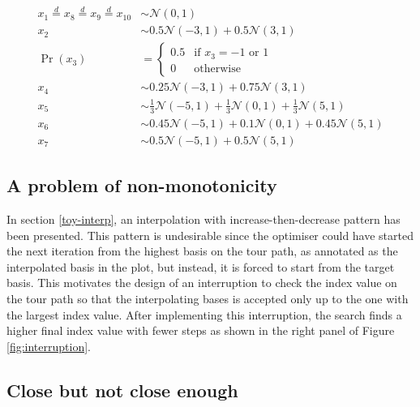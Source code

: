 \begin{align}
x_1 \overset{d}{=} x_8 \overset{d}{=} x_9 \overset{d}{=} x_{10}& \sim \mathcal{N}(0, 1) \label{eq:sim-norm} \\
x_2 &\sim 0.5 \mathcal{N}(-3, 1) + 0.5 \mathcal{N}(3, 1)\label{eq:sim-x2}\\
\Pr(x_3) &= 
\begin{cases}
0.5 & \text{if $x_3 = -1$ or $1$}\\
0 & \text{otherwise}
\end{cases}\label{eq:sim-x3}\\
x_4 &\sim 0.25 \mathcal{N}(-3, 1) + 0.75 \mathcal{N}(3, 1) \label{eq:sim-x4}\\
x_5 &\sim \frac{1}{3} \mathcal{N}(-5, 1) + \frac{1}{3} \mathcal{N}(0, 1) + \frac{1}{3} \mathcal{N}(5, 1)\label{eq:sim-x5}\\
x_6 &\sim 0.45 \mathcal{N}(-5, 1) + 0.1 \mathcal{N}(0, 1) + 0.45 \mathcal{N}(5, 1)\label{eq:sim-x6}\\
x_7 &\sim 0.5 \mathcal{N}(-5, 1) + 0.5 \mathcal{N}(5, 1) 
\label{eq:sim-x7}
\end{align}

\hypertarget{monotonic}{%
\subsection{A problem of non-monotonicity}\label{monotonic}}

In section \ref{toy-interp}, an interpolation with
increase-then-decrease pattern has been presented. This pattern is
undesirable since the optimiser could have started the next iteration
from the highest basis on the tour path, as annotated as the
interpolated basis in the plot, but instead, it is forced to start from
the target basis. This motivates the design of an interruption to check
the index value on the tour path so that the interpolating bases is
accepted only up to the one with the largest index value. After
implementing this interruption, the search finds a higher final index
value with fewer steps as shown in the right panel of Figure
\ref{fig:interruption}.

\hypertarget{close-but-not-close-enough}{%
\subsection{Close but not close
enough}\label{close-but-not-close-enough}}

